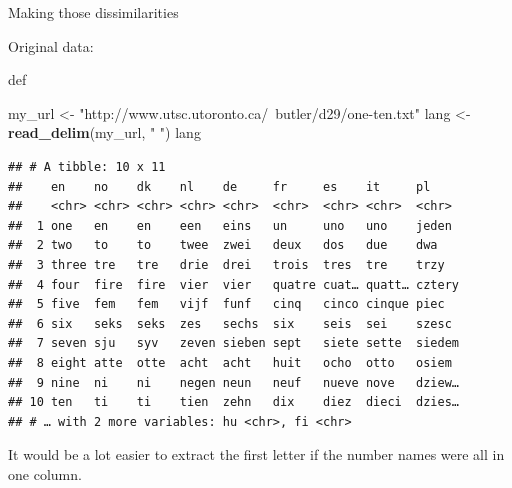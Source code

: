 \documentclass[ignorenonframetext,]{beamer}
\newenvironment{Shaded}{\begin{snugshade}}{\end{snugshade}}
\newcommand{\KeywordTok}[1]{\textcolor[rgb]{0.13,0.29,0.53}{\textbf{#1}}}
\newcommand{\NormalTok}[1]{#1}
\newcommand{\StringTok}[1]{\textcolor[rgb]{0.31,0.60,0.02}{#1}}
\begin{document}
\begin{frame}[fragile]{Making those dissimilarities}
\protect\hypertarget{making-those-dissimilarities}{}

Original data:

def

\begin{Shaded}
\begin{Highlighting}[]
\NormalTok{my_url <-}\StringTok{ "http://www.utsc.utoronto.ca/~butler/d29/one-ten.txt"}
\NormalTok{lang <-}\StringTok{ }\KeywordTok{read_delim}\NormalTok{(my_url, }\StringTok{" "}\NormalTok{)}
\NormalTok{lang}
\end{Highlighting}
\end{Shaded}

\begin{verbatim}
## # A tibble: 10 x 11
##    en    no    dk    nl    de     fr     es    it     pl    
##    <chr> <chr> <chr> <chr> <chr>  <chr>  <chr> <chr>  <chr> 
##  1 one   en    en    een   eins   un     uno   uno    jeden 
##  2 two   to    to    twee  zwei   deux   dos   due    dwa   
##  3 three tre   tre   drie  drei   trois  tres  tre    trzy  
##  4 four  fire  fire  vier  vier   quatre cuat… quatt… cztery
##  5 five  fem   fem   vijf  funf   cinq   cinco cinque piec  
##  6 six   seks  seks  zes   sechs  six    seis  sei    szesc 
##  7 seven sju   syv   zeven sieben sept   siete sette  siedem
##  8 eight atte  otte  acht  acht   huit   ocho  otto   osiem 
##  9 nine  ni    ni    negen neun   neuf   nueve nove   dziew…
## 10 ten   ti    ti    tien  zehn   dix    diez  dieci  dzies…
## # … with 2 more variables: hu <chr>, fi <chr>
\end{verbatim}

It would be a lot easier to extract the first letter if the number names
were all in one column.

\end{frame}
\end{document}
